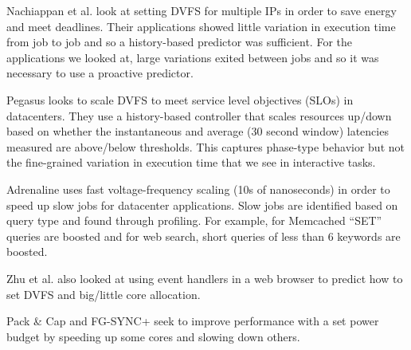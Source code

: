 Nachiappan et al. \cite{nachiappan-hpca15} look at setting DVFS for multiple
IPs in order to save energy and meet deadlines. Their applications showed
little variation in execution time from job to job and so a history-based
predictor was sufficient. For the applications we looked at, large variations
exited between jobs and so it was necessary to use a proactive predictor.

Pegasus \cite{pegasus-isca14} looks to scale DVFS to meet service level
objectives (SLOs) in datacenters. They use a history-based controller that
scales resources up/down based on whether the instantaneous and average (30 second window)
latencies measured are above/below thresholds. This captures phase-type
behavior but not the fine-grained variation in execution time that we see in
interactive tasks.

Adrenaline \cite{adrenaline-hpca15} uses fast voltage-frequency scaling (10s of
nanoseconds) in order to speed up slow jobs for datacenter applications. Slow
jobs are identified based on query type and found through profiling. For
example, for Memcached ``SET'' queries are boosted and for web search, short
queries of less than 6 keywords are boosted.

Zhu et al. \cite{eqos-hpca15} also looked at using event handlers in a web
browser to predict how to set DVFS and big/little core allocation.

Pack \& Cap \cite{packandcap-micro44} and FG-SYNC+ \cite{fgsync-micro14} seek
to improve performance with a set power budget by speeding up some cores and
slowing down others.
